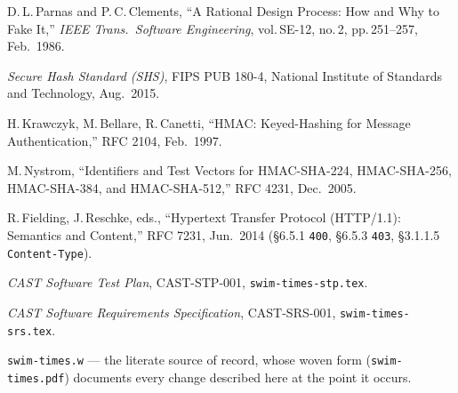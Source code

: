 \documentclass[11pt]{article}
\newcommand{\code}[1]{\texttt{#1}}
\begin{document}
\begin{enumerate}[leftmargin=*,label={[\arabic*]}]
\item D.\,L.\,Parnas and P.\,C.\,Clements, ``A Rational Design Process:
      How and Why to Fake It,'' \textit{IEEE Trans.\ Software
      Engineering}, vol.\,SE-12, no.\,2, pp.\,251--257, Feb.\ 1986.
\item \textit{Secure Hash Standard (SHS)}, FIPS PUB 180-4, National
      Institute of Standards and Technology, Aug.\ 2015.
\item H.\,Krawczyk, M.\,Bellare, R.\,Canetti, ``HMAC: Keyed-Hashing for
      Message Authentication,'' RFC 2104, Feb.\ 1997.
\item M.\,Nystrom, ``Identifiers and Test Vectors for HMAC-SHA-224,
      HMAC-SHA-256, HMAC-SHA-384, and HMAC-SHA-512,'' RFC 4231,
      Dec.\ 2005.
\item R.\,Fielding, J.\,Reschke, eds., ``Hypertext Transfer Protocol
      (HTTP/1.1): Semantics and Content,'' RFC 7231, Jun.\ 2014
      (\S6.5.1 \code{400}, \S6.5.3 \code{403}, \S3.1.1.5
      \code{Content-Type}).
\item \textit{CAST Software Test Plan}, CAST-STP-001,
      \code{swim-times-stp.tex}.
\item \textit{CAST Software Requirements Specification}, CAST-SRS-001,
      \code{swim-times-srs.tex}.
\item \code{swim-times.w} --- the literate source of record, whose
      woven form (\code{swim-times.pdf}) documents every change
      described here at the point it occurs.
\end{enumerate}
\end{document}
